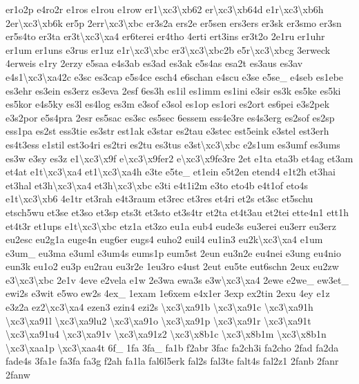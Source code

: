\begin{DoxyCompactItemize}
er1o2p e4ro2r e1ros e1rou e1row er1\textbackslash{}xc3\textbackslash{}xb62 er\textbackslash{}xc3\textbackslash{}xb64d e1r\textbackslash{}xc3\textbackslash{}xb6h 2er\textbackslash{}xc3\textbackslash{}xb6k er5p 2err\textbackslash{}xc3\textbackslash{}xbc er3s2a ers2e er5sen ers3ers er3sk er3smo er3sn er5s4to er3ta er3t\textbackslash{}xc3\textbackslash{}xa4 er6terei er4tho 4erti ert3ins er3t2o 2e1ru er1uhr er1um er1uns e3rus er1uz e1r\textbackslash{}xc3\textbackslash{}xbc er3\textbackslash{}xc3\textbackslash{}xbc2b e5r\textbackslash{}xc3\textbackslash{}xbcg 3erweck 4erweis e1ry 2erzy e5saa e4s3ab es3ad es3ak e5s4as esa2t es3aus es3av e4s1\textbackslash{}xc3\textbackslash{}xa42c e3sc es3cap e5s4ce esch4 e6schan e4scu e3se e5se\-\_\- e4seb es1ebe es3ehr es3ein es3erz es3eva 2esf 6es3h es1il es1imm es1ini e3sir es3k es5ke es5ki es5kor e4s5ky es3l es4log es3m e3sof e3sol es1op es1ori es2ort es6pei e3s2pek e3s2por e5s4pra 2esr es5sac es3sc es5sec 6essem ess4e3re es4s3erg es2sof es2sp ess1pa es2st ess3tie es3str est1ak e3star es2tau e3stec est5eink e3stel est3erh es4t3ess e1stil est3o4ri es2tri es2tu es3tus e3st\textbackslash{}xc3\textbackslash{}xbc e2s1um es3umf es3ums es3w e3sy es3z e1\textbackslash{}xc3\textbackslash{}x9f e\textbackslash{}xc3\textbackslash{}x9fer2 e\textbackslash{}xc3\textbackslash{}x9fe3re 2et e1ta eta3b et4ag et3am et4at e1t\textbackslash{}xc3\textbackslash{}xa4 et1\textbackslash{}xc3\textbackslash{}xa4h e3te e5te\-\_\- et1ein e5t2en etend4 e1t2h et3hai et3hal et3h\textbackslash{}xc3\textbackslash{}xa4 et3h\textbackslash{}xc3\textbackslash{}xbc e3ti e4t1i2m e3to eto4b e4t1of eto4s e1t\textbackslash{}xc3\textbackslash{}xb6 4e1tr et3rah e4t3raum et3rec et3res et4ri et2s et3sc et5schu etsch5wu et3se et3so et3sp ets3t et3sto et3s4tr et2ta et4t3au et2tei ette4n1 ett1h et4t3r et1ups e1t\textbackslash{}xc3\textbackslash{}xbc etz1a et3zo eu1a eub4 eude3s eu3erei eu3err eu3erz eu2esc eu2g1a euge4n eug6er eugs4 euho2 euil4 eu1in3 eu2k\textbackslash{}xc3\textbackslash{}xa4 e1um e3um\-\_\- eu3ma e3uml e3um4s eums1p eum5st 2eun eu3n2e eu4nei e3ung eu4nio eun3k eu1o2 eu3p eu2rau eu3r2e 1eu3ro e4ust 2eut eu5te eut6schn 2eux eu2zw e3\textbackslash{}xc3\textbackslash{}xbc 2e1v 4eve e2vela e1w 2e3wa ewa3s e3w\textbackslash{}xc3\textbackslash{}xa4 2ewe e2we\-\_\- ew3et\-\_\- ewi2s e3wit e5wo ew2s 4ex\-\_\- 1exam 1e6xem e4x1er 3exp ex2tin 2exu 4ey e1z e3z2a ez2\textbackslash{}xc3\textbackslash{}xa4 ezen3 ezin4 ezi2s \textbackslash{}xc3\textbackslash{}xa91b \textbackslash{}xc3\textbackslash{}xa91c \textbackslash{}xc3\textbackslash{}xa91h \textbackslash{}xc3\textbackslash{}xa91l \textbackslash{}xc3\textbackslash{}xa9lu2 \textbackslash{}xc3\textbackslash{}xa91o \textbackslash{}xc3\textbackslash{}xa91p \textbackslash{}xc3\textbackslash{}xa91r \textbackslash{}xc3\textbackslash{}xa91t \textbackslash{}xc3\textbackslash{}xa91u4 \textbackslash{}xc3\textbackslash{}xa91v \textbackslash{}xc3\textbackslash{}xa91z2 \textbackslash{}xc3\textbackslash{}x8b1c \textbackslash{}xc3\textbackslash{}x8b1m \textbackslash{}xc3\textbackslash{}x8b1n \textbackslash{}xc3\textbackslash{}xaa1p \textbackslash{}xc3\textbackslash{}xaa4t 6f\-\_\- 1fa 3fa\-\_\- fa1b f2abr 3fac fa2ch3i fa2cho 2fad fa2da fade4s 3fa1e fa3fa fa3g f2ah fa1la fal6l5erk fal2s fal3te falt4s fal2z1 2fanb 2fanr 2fanw 
\end{DoxyCompactItemize}
